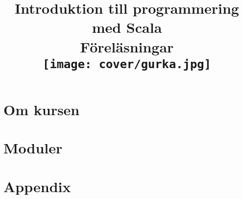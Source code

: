 \documentclass[a4paper]{compendium}
\title{
{\vspace{-3.0cm}\bf\sffamily\Huge\selectfont  Introduktion till programmering med Scala}
\\ \vspace{1em}%
{\sffamily  Föreläsningar}\\\vspace{2cm}
\texttt{[image: cover/gurka.jpg]}
}
\date{\raggedbottom%
\vspace{-2em}\begin{minipage}{1.0\textwidth}\centering
EDAA45, Lp1-2, HT \CurrentYear\\
Datavetenskap, LTH\\
Lunds Universitet\\
~\\
Kompileringsdatum: \today \\
\url{http://cs.lth.se/pgk}
\end{minipage}
}
\newcommand{\SlideHeading}[1]{\section*{#1}}
\begin{document}

\frontmatter
\maketitle




\setcounter{tocdepth}{2} %
\tableofcontents
\mainmatter


\part{Om kursen}
\setcounter{chapter}{-3}





\part{Moduler}

















\part{Appendix}
\appendix











\end{document}
